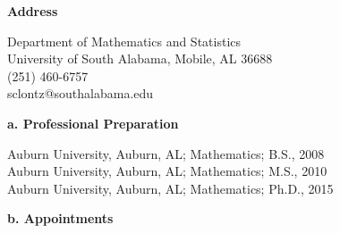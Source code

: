 
\vspace{-4\baselineskip}




\textbf{Address}

\noindent Department of Mathematics and Statistics \\
University of South Alabama, Mobile, AL 36688\\
(251) 460-6757\\
sclontz@southalabama.edu

\medskip

\medskip

\noindent\textbf{a. \medskip Professional Preparation}

 \noindent   Auburn University, Auburn, AL;
        Mathematics;
        B.S., 2008
        \\
     Auburn University, Auburn, AL;
        Mathematics;
        M.S., 2010
        \\
     Auburn University, Auburn, AL;
        Mathematics;
        Ph.D., 2015
        \\

\medskip

\noindent\textbf{b. \medskip Appointments}

